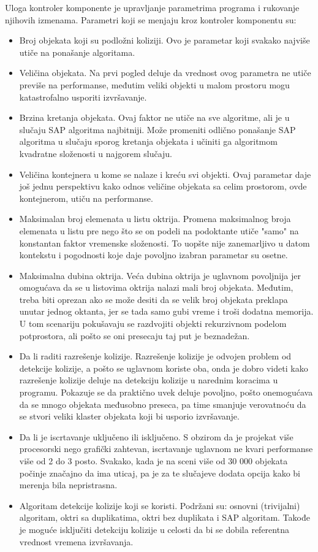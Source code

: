 \documentclass[12pt,oneside]{memoir}
\begin{document}
Uloga kontroler komponente je upravljanje parametrima programa i rukovanje njihovih izmenama.
Parametri koji se menjaju kroz kontroler komponentu su: 
\begin{itemize}  
	\item Broj objekata koji su podložni koliziji. 
	Ovo je parametar koji svakako najviše utiče na ponašanje algoritama.
	\item Veličina objekata. 
	Na prvi pogled deluje da vrednost ovog parametra ne utiče previše na performanse, međutim veliki objekti u malom prostoru mogu katastrofalno usporiti izvršavanje.
	\item Brzina kretanja objekata.
	Ovaj faktor ne utiče na sve algoritme, ali je u slučaju SAP algoritma najbitniji. Može promeniti odlično ponašanje SAP algoritma u slučaju sporog kretanja 
	objekata i učiniti ga algoritmom kvadratne složenosti u najgorem slučaju.
	\item Veličina kontejnera u kome se nalaze i kreću svi objekti.
	Ovaj parametar daje još jednu perspektivu kako odnos veličine objekata sa celim prostorom, ovde kontejnerom, utiču na performanse.
	\item Maksimalan broj elemenata u listu oktrija.
	Promena maksimalnog broja elemenata u listu pre nego što se on podeli na podoktante utiče "samo" na konstantan faktor vremenske složenosti.
	To uopšte nije zanemarljivo u datom kontekstu i pogodnosti koje daje povoljno izabran parametar su osetne.
	\item Maksimalna dubina oktrija. Veća dubina oktrija je uglavnom povoljnija jer omogućava da se u listovima oktrija nalazi mali broj objekata.
	Međutim, treba biti oprezan ako se može desiti 
	da se velik broj objekata preklapa unutar jednog oktanta, jer se tada samo gubi vreme i troši dodatna memorija. 
	U tom scenariju pokušavaju se razdvojiti objekti rekurzivnom podelom potprostora, ali pošto se oni presecaju taj put je beznadežan.
	\item Da li raditi razrešenje kolizije. 
	Razrešenje kolizije je odvojen problem od detekcije kolizije, a pošto se uglavnom koriste oba, onda je dobro videti 
	kako razrešenje kolizije deluje na detekciju kolizije u narednim koracima u programu. Pokazuje se da praktično uvek deluje povoljno, pošto onemogućava da se mnogo 
	objekata međusobno preseca, pa time smanjuje verovatnoću da se stvori veliki klaster objekata koji bi usporio izvršavanje.
	\item Da li je iscrtavanje uključeno ili isključeno. 
	S obzirom da je projekat više procesorski nego grafički zahtevan, iscrtavanje uglavnom ne kvari performanse više od 2 do 3 posto.
	Svakako, kada je na sceni više od 30 000 objekata počinje značajno da ima uticaj, pa je za te slučajeve dodata opcija kako bi merenja bila nepristrasna.
	\item Algoritam detekcije kolizije koji se koristi. Podržani su: osnovni (trivijalni) algoritam, oktri sa duplikatima,
	oktri bez duplikata i SAP algoritam. Takođe je moguće isključiti detekciju kolizije u celosti da bi se dobila referentna vrednost vremena izvršavanja.

\end{itemize}  
\end{document}
